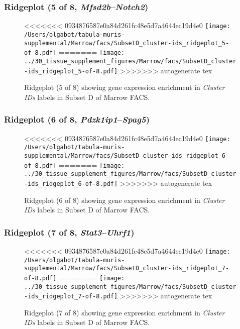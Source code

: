 \clearpage

\subsubsection{Ridgeplot (5 of 8, \emph{Mfsd2b}--\emph{Notch2})}
\begin{figure}[h]
\centering
<<<<<<< 0934876587e0a84d261fc48e5d7a4644ec19d4e0
\texttt{[image: /Users/olgabot/tabula-muris-supplemental/Marrow/facs/SubsetD\_cluster-ids\_ridgeplot\_5-of-8.pdf]}
=======
\texttt{[image: ../30\_tissue\_supplement\_figures/Marrow/facs/SubsetD\_cluster-ids\_ridgeplot\_5-of-8.pdf]}
>>>>>>> autogenerate tex

\caption{ Ridgeplot (5 of 8)  showing gene expression enrichment in \emph{Cluster IDs} labels in Subset D of Marrow FACS. }
\end{figure}


\clearpage

\subsubsection{Ridgeplot (6 of 8, \emph{Pdzk1ip1}--\emph{Spag5})}
\begin{figure}[h]
\centering
<<<<<<< 0934876587e0a84d261fc48e5d7a4644ec19d4e0
\texttt{[image: /Users/olgabot/tabula-muris-supplemental/Marrow/facs/SubsetD\_cluster-ids\_ridgeplot\_6-of-8.pdf]}
=======
\texttt{[image: ../30\_tissue\_supplement\_figures/Marrow/facs/SubsetD\_cluster-ids\_ridgeplot\_6-of-8.pdf]}
>>>>>>> autogenerate tex

\caption{ Ridgeplot (6 of 8)  showing gene expression enrichment in \emph{Cluster IDs} labels in Subset D of Marrow FACS. }
\end{figure}


\clearpage

\subsubsection{Ridgeplot (7 of 8, \emph{Stat3}--\emph{Uhrf1})}
\begin{figure}[h]
\centering
<<<<<<< 0934876587e0a84d261fc48e5d7a4644ec19d4e0
\texttt{[image: /Users/olgabot/tabula-muris-supplemental/Marrow/facs/SubsetD\_cluster-ids\_ridgeplot\_7-of-8.pdf]}
=======
\texttt{[image: ../30\_tissue\_supplement\_figures/Marrow/facs/SubsetD\_cluster-ids\_ridgeplot\_7-of-8.pdf]}
>>>>>>> autogenerate tex

\caption{ Ridgeplot (7 of 8)  showing gene expression enrichment in \emph{Cluster IDs} labels in Subset D of Marrow FACS. }
\end{figure}


